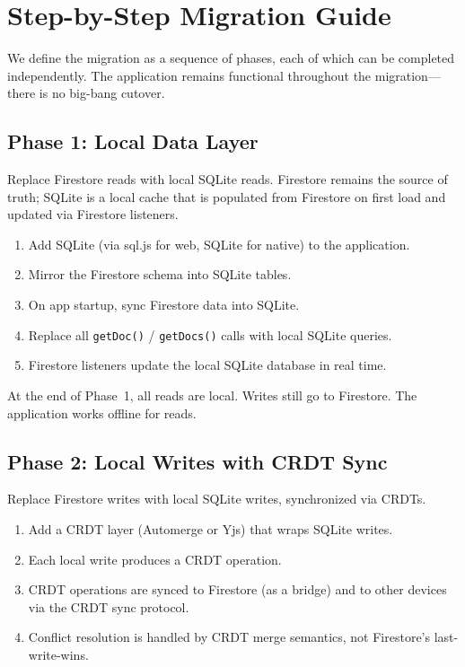 \section{Step-by-Step Migration Guide}
\label{sec:migration}

We define the migration as a sequence of phases, each of which can be
completed independently. The application remains functional throughout
the migration---there is no big-bang cutover.

\subsection{Phase 1: Local Data Layer}

Replace Firestore reads with local SQLite reads. Firestore remains the
source of truth; SQLite is a local cache that is populated from Firestore
on first load and updated via Firestore listeners.

\begin{enumerate}
    \item Add SQLite (via sql.js for web, SQLite for native) to the application.
    \item Mirror the Firestore schema into SQLite tables.
    \item On app startup, sync Firestore data into SQLite.
    \item Replace all \texttt{getDoc()} / \texttt{getDocs()} calls with local
    SQLite queries.
    \item Firestore listeners update the local SQLite database in real time.
\end{enumerate}

At the end of Phase~1, all reads are local. Writes still go to Firestore.
The application works offline for reads.

\subsection{Phase 2: Local Writes with CRDT Sync}

Replace Firestore writes with local SQLite writes, synchronized via CRDTs.

\begin{enumerate}
    \item Add a CRDT layer (Automerge or Yjs) that wraps SQLite writes.
    \item Each local write produces a CRDT operation.
    \item CRDT operations are synced to Firestore (as a bridge) and to
    other devices via the CRDT sync protocol.
    \item Conflict resolution is handled by CRDT merge semantics, not
    Firestore's last-write-wins.
\end{enumerate}

